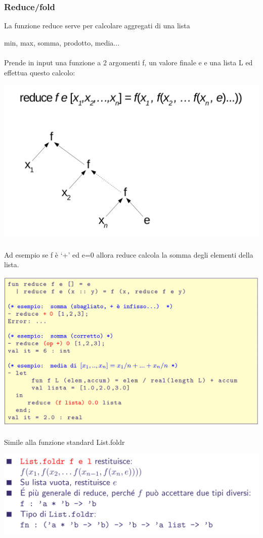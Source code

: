\documentclass[10pt]{article}
\begin{document}
\subsubsection{Reduce/fold}
La funzione reduce serve per calcolare aggregati di una lista

min, max, somma, prodotto, media...
\\\\
Prende in input una funzione a 2 argomenti f, un valore finale e
e una lista L ed effettua questo calcolo:

\includegraphics[scale=0.2]{Immagini/ml34.png}
\\\\
Ad esempio se f è ‘+’ ed e=0 allora reduce calcola la somma
degli elementi della lista.

\includegraphics[scale=0.2]{Immagini/ml35.png}
\\\\
Simile alla funzione standard List.foldr

\includegraphics[scale=0.2]{Immagini/ml36.png}
\end{document}
